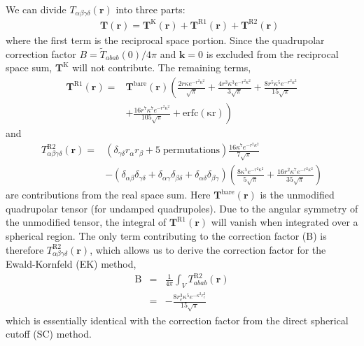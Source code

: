 We can divide ${T}_{\alpha\beta\gamma\delta}(\mathbf{r})$ into three
parts:
\begin{eqnarray}
& & \mathbf{T}(\mathbf{r}) =
    \mathbf{T}^\mathrm{K}(\mathbf{r}) +
    \mathbf{T}^\mathrm{R1}(\mathbf{r}) +
    \mathbf{T}^\mathrm{R2}(\mathbf{r}) 
\end{eqnarray}
where the first term is the reciprocal space portion.  Since the
quadrupolar correction factor $B = \tilde{T}_{abab}(0) / 4\pi$ and
$\mathbf{k} = 0 $ is excluded from the reciprocal space sum,
$\mathbf{T}^\mathrm{K}$ will not contribute.\cite{NeumannII83} The
remaining terms,
\begin{align}
\mathbf{T}^\mathrm{R1}(\mathbf{r}) =&  \mathbf{T}^\mathrm{bare}(\mathbf{r}) \left(\frac{2r\kappa e^{-r^2
          \kappa^2}}{\sqrt{\pi}}+\frac{4r^3\kappa^3 e^{-r^2 \kappa^2}}{3\sqrt{\pi}}+\frac{8r^5\kappa^5 e^{-r^2 \kappa^2}}{15\sqrt{\pi}} \right. \nonumber \\
 &+ \left. \frac{16r^7\kappa^7 e^{-r^2 \kappa^2}}{105\sqrt{\pi}} +  \mathrm{erfc(\kappa r)} \right)
\end{align}
and
\begin{align}
T^\mathrm{R2}_{\alpha\beta\gamma\delta}(\mathbf{r}) =&  \left(\delta_{\gamma\delta} r_\alpha r_\beta +  \mathrm{ 5\; permutations}\right) \frac{16 \kappa^7 e^{-r^2 \kappa^2}}{7\sqrt{\pi}} \nonumber \\
& -\left(\delta_{\alpha\beta}\delta_{\gamma\delta}+\delta_{\alpha\gamma}\delta_{\beta\delta}+\delta_{\alpha\delta}\delta_{\beta\gamma}\right) \left(\frac{8 \kappa^5 e^{-r^2 \kappa^2}}{5\sqrt{\pi}}+ \frac{16 r^2\kappa^7 e^{-r^2 \kappa^2}}{35\sqrt{\pi} }\right)
\end{align}
are contributions from the real space
sum.\cite{Adams76,Adams80,Adams81} Here
$\mathbf{T}^\mathrm{bare}(\mathbf{r})$ is the unmodified quadrupolar
tensor (for undamped quadrupoles).  Due to the angular symmetry of the
unmodified tensor, the integral of
$\mathbf{T}^\mathrm{R1}(\mathbf{r})$ will vanish when integrated over
a spherical region. The only term contributing to the correction
factor (B) is therefore
$T^\mathrm{R2}_{\alpha\beta\gamma\delta}(\mathbf{r})$, which allows us
to derive the correction factor for the Ewald-Kornfeld (EK) method,
\begin{eqnarray}
\mathrm{B} &=& \frac{1}{4\pi} \int_V T^\mathrm{R2}_{abab}(\mathbf{r}) \nonumber \\
&=& -\frac{8r_c^3 \kappa^5 e^{-\kappa^2 r_c^2}}{15\sqrt{\pi}}
\end{eqnarray}  
which is essentially identical with the correction factor from the
direct spherical cutoff (SC) method.

